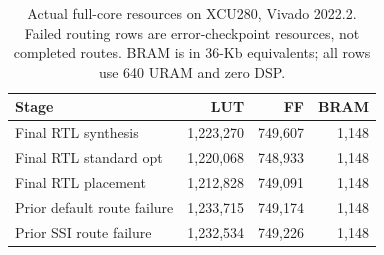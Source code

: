 \begin{table}[t]\centering
\caption{Actual full-core resources on XCU280, Vivado 2022.2. Failed routing rows are error-checkpoint resources, not completed routes. BRAM is in 36-Kb equivalents; all rows use 640 URAM and zero DSP.}\label{tab:physical}
\begin{tabular}{lrrr}\toprule Stage & LUT & FF & BRAM\\\midrule
Final RTL synthesis & 1,223,270 & 749,607 & 1,148\\
Final RTL standard opt & 1,220,068 & 748,933 & 1,148\\
Final RTL placement & 1,212,828 & 749,091 & 1,148\\
Prior default route failure & 1,233,715 & 749,174 & 1,148\\
Prior SSI route failure & 1,232,534 & 749,226 & 1,148\\
\bottomrule\end{tabular}
\end{table}
